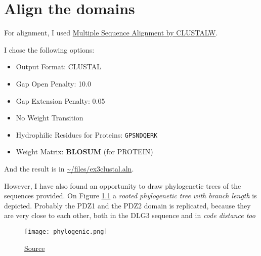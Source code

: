 \chapter{Align the domains}
For alignment, I used \href{http://www.genome.jp/tools/clustalw/}{Multiple Sequence Alignment by CLUSTALW}.

I chose the following options:
\begin{itemize}
\item Output Format: CLUSTAL
\item Gap Open Penalty: 10.0
\item Gap Extension Penalty: 0.05
\item No Weight Transition
\item Hydrophilic Residues for Proteins: \texttt{GPSNDQERK}
\item Weight Matrix: \textbf{BLOSUM} (for PROTEIN)
\end{itemize}

And the result is in \url{~/files/ex3clustal.aln}.

However, I have also found an opportunity to draw phylogenetic trees of the sequences provided. On Figure \ref{phytree1} a \emph{rooted 
phylogenetic tree with branch length} is depicted.
Probably the PDZ1 and the PDZ2 domain is replicated, because they are very close to each other, both in the DLG3 sequence and in \emph{code distance too}

\begin{figure}
\centering
\texttt{[image: phylogenic.png]}
\caption{\href{http://www.genome.jp/tools-bin/clustalwtree?treebl_upgma+1611190754597I9T9}{Source}}
\label{phytree1}
\end{figure}

